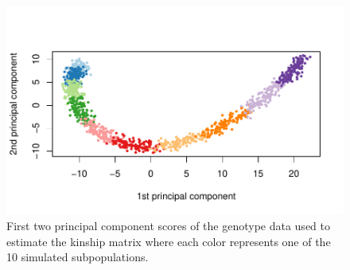 \documentclass[12pt,letter]{article}\usepackage[]{graphicx}\usepackage[]{color}
\newenvironment{knitrout}{}{} %
\begin{document}
\begin{knitrout}\scriptsize
{}\color{fgcolor}\begin{figure}[H]

{\centering \includegraphics[width=1\linewidth]{figure/plot-pc-sim-1} 

}

\caption[First two principal component scores of the genotype data used to estimate the kinship matrix where each color represents one of the 10 simulated subpopulations]{First two principal component scores of the genotype data used to estimate the kinship matrix where each color represents one of the 10 simulated subpopulations.}\label{fig:plot-pc-sim}
\end{figure}


\end{knitrout}
\end{document}
